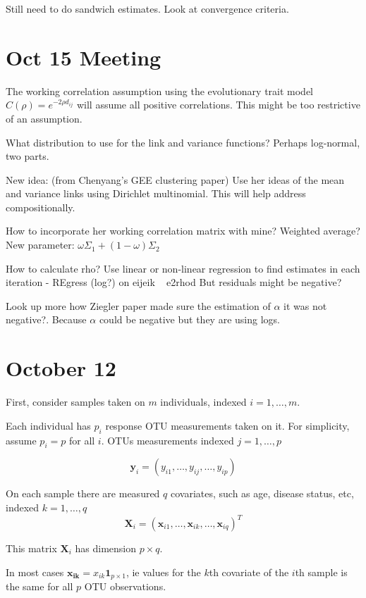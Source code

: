 \documentclass[10pt]{article}
\begin{document}
Still need to do sandwich estimates.
Look at convergence criteria.


\section{Oct 15 Meeting}

The working correlation assumption using the evolutionary trait model $C(\rho) = e^{-2\rho d_{ij}}$ will assume all positive correlations. This might be too restrictive of an assumption.

What distribution to use for the link and variance functions? Perhaps log-normal, two parts.

New idea: (from Chenyang's GEE clustering paper) Use her ideas of the mean and variance links using Dirichlet multinomial. This will help address compositionally.

How to incorporate her working correlation matrix with mine? Weighted average? New parameter: $\omega \Sigma_1 + (1 - \omega)\Sigma_2$

How to calculate rho? Use linear or non-linear regression to find estimates in each iteration
- REgress (log?) on eijeik ~ e2rhod
But residuals might be negative?

Look up more how Ziegler paper made sure the estimation of $\alpha$ it was not negative?. Because $\alpha$ could be negative but they are using logs.



\section{October 12}

First, consider samples taken on $m$ individuals, indexed $i = 1, \ldots , m$.


Each individual has $p_i$ response OTU measurements taken on it. For simplicity, assume $p_i = p$ for all $i$. OTUs measurements indexed $j = 1, \ldots , p $

$$\mathbf{y}_i = (y_{i1}, \ldots, y_{ij}, \ldots , y_{ip})$$




On each sample there are measured $q$ covariates, such as age, disease status, etc, indexed $k = 1, \ldots, q$
$$\mathbf{X}_i = (\mathbf{x}_{i1}, \ldots, \mathbf{x}_{ik}, \ldots , \mathbf{x}_{iq})^T$$

This matrix $\mathbf{X}_i$ has dimension $p \times q$.

In most cases $\mathbf{x_{ik}} = x_{ik}\boldsymbol{1}_{p \times 1}$, ie values for the $k$th covariate of the $i$th sample is the same for all $p$ OTU observations.
\end{document}
